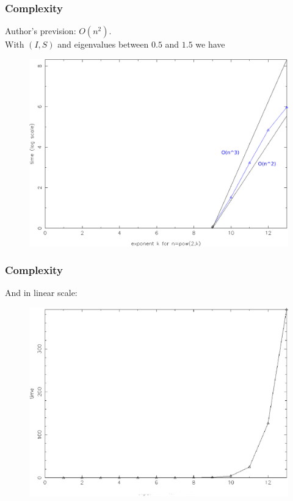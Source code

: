 \documentclass{beamer}
\theoremstyle{definition} \newtheorem{de}{Def}
\theoremstyle{remark} \newtheorem{os}[de]{Remark}
\theoremstyle{plain} \newtheorem{te}[de]{Teo}
\theoremstyle{plain} \newtheorem{co}[de]{Cor}
\theoremstyle{plain} \newtheorem{pr}[de]{Prop}
\theoremstyle{plain} \newtheorem{lem}[de]{Lemm}
\theoremstyle{remark} \newtheorem{rem}[de]{Remark}
\begin{document}
\begin{frame}
  \frametitle{Complexity}

  Author's prevision: $O(n^2)$.\\
  With $(I,S)$ and eigenvalues between $0.5$ and $1.5$ we have

  \begin{figure}
    \centering
    \includegraphics[scale=0.3]{images/Tempi_con_riferimento_quadrato_13.pdf}
  \end{figure}
  
\end{frame}

\begin{frame}
  \frametitle{Complexity}

  And in linear scale:

  \begin{figure}
    \centering
    \includegraphics[scale=0.3]{images/Tempi_13.pdf}
  \end{figure}

\end{frame}
\end{document}
